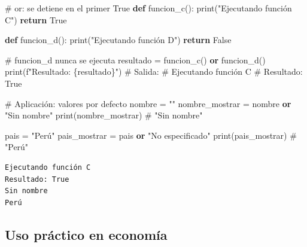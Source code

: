 \documentclass[
  doc,
  floatsintext,
  longtable,
  a4paper,
  nolmodern,
  notxfonts,
  notimes,
  12pt,
  colorlinks=true,linkcolor=blue,citecolor=blue,urlcolor=blue]{apa7}
\newenvironment{Shaded}{\begin{snugshade}}{\end{snugshade}}
\newcommand{\BuiltInTok}[1]{\textcolor[rgb]{0.00,0.23,0.31}{#1}}
\newcommand{\CommentTok}[1]{\textcolor[rgb]{0.37,0.37,0.37}{#1}}
\newcommand{\ControlFlowTok}[1]{\textcolor[rgb]{0.00,0.23,0.31}{\textbf{#1}}}
\newcommand{\KeywordTok}[1]{\textcolor[rgb]{0.00,0.23,0.31}{\textbf{#1}}}
\newcommand{\NormalTok}[1]{\textcolor[rgb]{0.00,0.23,0.31}{#1}}
\newcommand{\OperatorTok}[1]{\textcolor[rgb]{0.37,0.37,0.37}{#1}}
\newcommand{\SpecialCharTok}[1]{\textcolor[rgb]{0.37,0.37,0.37}{#1}}
\newcommand{\SpecialStringTok}[1]{\textcolor[rgb]{0.13,0.47,0.30}{#1}}
\newcommand{\StringTok}[1]{\textcolor[rgb]{0.13,0.47,0.30}{#1}}
\newcommand{\VariableTok}[1]{\textcolor[rgb]{0.07,0.07,0.07}{#1}}
\begin{document}
\begin{Shaded}
\begin{Highlighting}[]
\CommentTok{\# or: se detiene en el primer True}
\KeywordTok{def}\NormalTok{ funcion\_c():}
    \BuiltInTok{print}\NormalTok{(}\StringTok{"Ejecutando función C"}\NormalTok{)}
    \ControlFlowTok{return} \VariableTok{True}

\KeywordTok{def}\NormalTok{ funcion\_d():}
    \BuiltInTok{print}\NormalTok{(}\StringTok{"Ejecutando función D"}\NormalTok{)}
    \ControlFlowTok{return} \VariableTok{False}

\CommentTok{\# funcion\_d nunca se ejecuta}
\NormalTok{resultado }\OperatorTok{=}\NormalTok{ funcion\_c() }\KeywordTok{or}\NormalTok{ funcion\_d()}
\BuiltInTok{print}\NormalTok{(}\SpecialStringTok{f"Resultado: }\SpecialCharTok{\{}\NormalTok{resultado}\SpecialCharTok{\}}\SpecialStringTok{"}\NormalTok{)}
\CommentTok{\# Salida:}
\CommentTok{\# Ejecutando función C}
\CommentTok{\# Resultado: True}

\CommentTok{\# Aplicación: valores por defecto}
\NormalTok{nombre }\OperatorTok{=} \StringTok{""}
\NormalTok{nombre\_mostrar }\OperatorTok{=}\NormalTok{ nombre }\KeywordTok{or} \StringTok{"Sin nombre"}
\BuiltInTok{print}\NormalTok{(nombre\_mostrar)  }\CommentTok{\# "Sin nombre"}

\NormalTok{pais }\OperatorTok{=} \StringTok{"Perú"}
\NormalTok{pais\_mostrar }\OperatorTok{=}\NormalTok{ pais }\KeywordTok{or} \StringTok{"No especificado"}
\BuiltInTok{print}\NormalTok{(pais\_mostrar)  }\CommentTok{\# "Perú"}
\end{Highlighting}
\end{Shaded}

\begin{verbatim}
Ejecutando función C
Resultado: True
Sin nombre
Perú
\end{verbatim}

\subsection{Uso práctico en
economía}\label{uso-pruxe1ctico-en-economuxeda}
\end{document}
